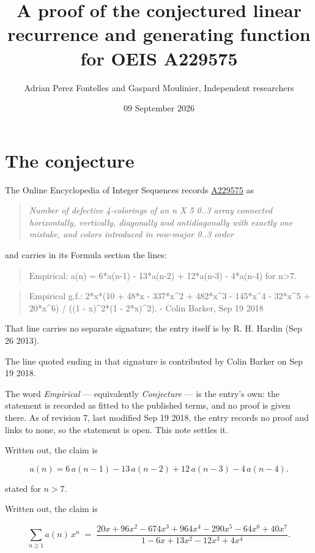 \documentclass[11pt]{article}
\title{A proof of the conjectured linear recurrence and generating function for OEIS A229575}
\author{Adrian Perez Fontelles and Gaspard Moulinier, Independent researchers}
\date{09 September 2026}
\theoremstyle{definition}
\begin{document}
\maketitle
\section{The conjecture}

The Online Encyclopedia of Integer Sequences records \href{https://oeis.org/A229575}{A229575} as

\begin{quote}\itshape Number of defective 4-colorings of an n X 5 0..3 array connected horizontally, vertically, diagonally and antidiagonally with exactly one mistake, and colors introduced in row-major 0..3 order\end{quote}

and carries in its Formula section the lines:

\begin{quote}\ttfamily Empirical: a(n) = 6*a(n-1) - 13*a(n-2) + 12*a(n-3) - 4*a(n-4) for n>7.\end{quote}

\begin{quote}\ttfamily Empirical g.f.: 2*x*(10 + 48*x - 337*x\textasciicircum{}2 + 482*x\textasciicircum{}3 - 145*x\textasciicircum{}4 - 32*x\textasciicircum{}5 + 20*x\textasciicircum{}6) / ((1 - x)\textasciicircum{}2*(1 - 2*x)\textasciicircum{}2). - Colin Barker, Sep 19 2018\end{quote}

That line carries no separate signature; the entry itself is by R. H. Hardin (Sep 26 2013).

The line quoted ending in that signature is contributed by Colin Barker on Sep 19 2018.

The word {\itshape Empirical} --- equivalently {\itshape Conjecture} --- is the entry's own: the statement is recorded as fitted to the published terms, and no proof is given there. As of revision 7, last modified Sep 19 2018, the entry records no proof and links to none, so the statement is open. This note settles it.

Written out, the claim is

\[a(n) = 6\,a(n-1) - 13\,a(n-2) + 12\,a(n-3) - 4\,a(n-4).\]

stated for $n > 7$.

Written out, the claim is

\[\sum_{n \ge 1} a(n)\,x^n \;=\; \frac{20x + 96x^{2} - 674x^{3} + 964x^{4} - 290x^{5} - 64x^{6} + 40x^{7}}{1 - 6x + 13x^{2} - 12x^{3} + 4x^{4}}.\]
\end{document}
